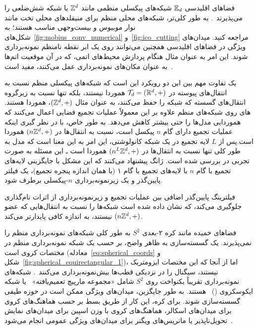 فضاهای اقلیدسی $\mathbb{E}_d$ شبکه‌های پیکسلی منظمی مانند $\mathbb{Z}^d$ یا شبکه شش‌ضلعی را می‌پذیرند~\cite{Hoogeboom2018-HEX}.
به طور کلی‌تر، شبکه‌های محلی منظم برای منیفلدهای محلی تخت مانند نوار موبیوس و بیست‌وجهی مناسب هستند؛ به شکل‌های~\ref{fig:mobius_conv_numerical} و~\ref{fig:ico_cutting} مراجعه کنید.
میدان‌های ویژگی در فضاهای اقلیدسی همچنین می‌توانند روی یک ابر نقطه نامنظم نمونه‌برداری شوند.
این امر به عنوان مثال هنگام پردازش محیط‌های اتمی، که در آن موقعیت اتم‌ها به عنوان مکان‌های نمونه‌برداری عمل می‌کنند، مفید است~\cite{Thomas2018-TFN}.

یک تفاوت مهم بین این دو رویکرد این است که شبکه‌های پیکسلی منظم نسبت به انتقال‌های پیوسته در $\mathcal{T}_d = (\mathbb{R}^d,+)$ هموردا نیستند، بلکه تنها نسبت به زیرگروه انتقال‌های گسسته که شبکه را حفظ می‌کنند، به عنوان مثال $(\mathbb{Z}^d,+)$، هموردا هستند. \CNN های روی شبکه‌های منظم علاوه بر این معمولاً عملیات تجمیع فضایی اعمال می‌کنند که هموردایی مدل‌ها را حتی بیشتر کاهش می‌دهد. به طور خاص، با در نظر گیری اینکه عملیات تجمیع دارای گام $n$ پیکسل است، نسبت به انتقال‌ها در $(n\mathbb{Z}^d,+)$ هموردا است.پس از $L$ لایه تجمیع در یک شبکه کانولوشنی، این امر به این معنا است که مدل به طور کلی تنها نسبت به انتقال‌ها در $(n^L\mathbb{Z}^d,+)$ هموردا است ـ این مسئله به صورت تجربی در \cite{azulay2018shift} بررسی شده است.\cite{zhang2019CNNsShiftInvariant} ژانگ پیشنهاد می‌کنند که این مشکل با جایگزینی لایه‌های تجمیع با گام $n$ با لایه‌های تجمیع با گام ۱ (با همان اندازه پنجره تجمیع)، یک فیلتر پایین‌گذر و یک زیرنمونه‌برداری $n$-پیکسلی برطرف شود.

فیلترینگ پایین‌گذر اضافی بین عملیات تجمیع و زیرنمونه‌برداری از اثرات نام‌گذاری جلوگیری می‌کند، که نشان داده شده است شبکه‌ها را نسبت به انتقال‌هایی که عضو $(n\mathbb{Z}^d,+)$ نیستند، به اندازه کافی پایدارتر می‌کند.

فضاهای خمیده مانند کره ۲-بعدی $S^2$ به طور کلی شبکه‌های نمونه‌برداری منظم را نمی‌پذیرند.
یک گسسته‌سازی به ظاهر واضح، بر حسب یک شبکه نمونه‌برداری منظم در مختصات کروی است (معادله~\eqref{eq:spherical_coords} و شکل~\ref{fig:spherical_equirectangular_1})، اما از آنجا که این مختصات ایزومتریک نیستند، سیگنال را در نزدیکی قطب‌ها بیش‌نمونه‌برداری می‌کنند~\cite{zhao2018distortion,tateno2018distortion}.
شبکه‌های نمونه‌برداری تقریباً یکنواخت روی $S^2$ شامل «مجموعه مارپیچ تعمیم‌یافته»~\cite{coors2018spherenet} یا شبکه ایکوسکروی ()~\cite{jiang2019spherical,kicanaoglu2019gaugeSphere} هستند.
به طور جایگزین، میدان‌های ویژگی ممکن است در حوزه طیفی گسسته‌سازی شوند.
برای کره، این کار از طریق بسط بر حسب هماهنگ‌های کروی برای میدان‌های اسکالر، هماهنگ‌های کروی با وزن اسپین برای میدان‌های نمایش تحویل‌ناپذیر یا ماتریس‌های  ویگنر برای میدان‌های ویژگی عمومی انجام می‌شود~\cite{esteves2018zonalSpherical,esteves2020spinweighted,Cohen2018-S2CNN,kondor2018ClebschGordan}.

